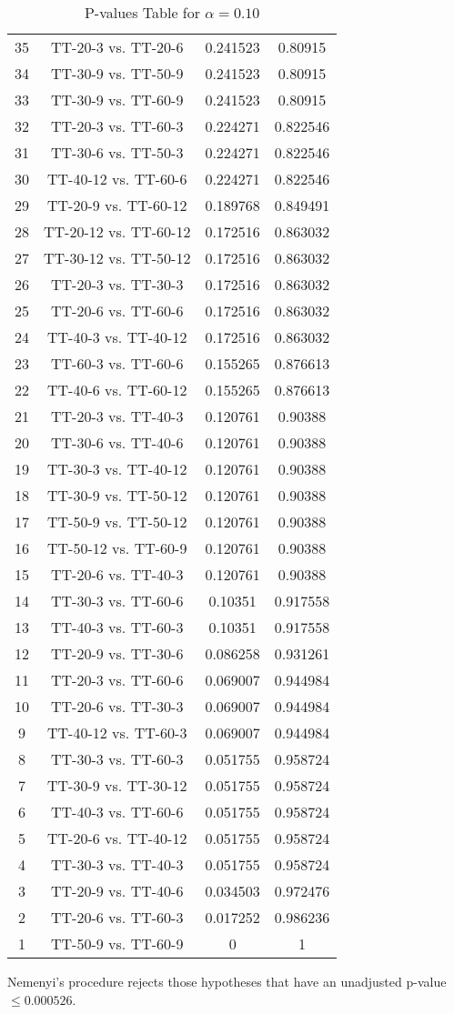\documentclass[a4paper,10pt]{article}
\begin{document}
\begin{landscape}
\begin{table}[!htp]
\begin{tabular}{cccc}
35&TT-20-3 vs. TT-20-6&0.241523&0.80915\\
34&TT-30-9 vs. TT-50-9&0.241523&0.80915\\
33&TT-30-9 vs. TT-60-9&0.241523&0.80915\\
32&TT-20-3 vs. TT-60-3&0.224271&0.822546\\
31&TT-30-6 vs. TT-50-3&0.224271&0.822546\\
30&TT-40-12 vs. TT-60-6&0.224271&0.822546\\
29&TT-20-9 vs. TT-60-12&0.189768&0.849491\\
28&TT-20-12 vs. TT-60-12&0.172516&0.863032\\
27&TT-30-12 vs. TT-50-12&0.172516&0.863032\\
26&TT-20-3 vs. TT-30-3&0.172516&0.863032\\
25&TT-20-6 vs. TT-60-6&0.172516&0.863032\\
24&TT-40-3 vs. TT-40-12&0.172516&0.863032\\
23&TT-60-3 vs. TT-60-6&0.155265&0.876613\\
22&TT-40-6 vs. TT-60-12&0.155265&0.876613\\
21&TT-20-3 vs. TT-40-3&0.120761&0.90388\\
20&TT-30-6 vs. TT-40-6&0.120761&0.90388\\
19&TT-30-3 vs. TT-40-12&0.120761&0.90388\\
18&TT-30-9 vs. TT-50-12&0.120761&0.90388\\
17&TT-50-9 vs. TT-50-12&0.120761&0.90388\\
16&TT-50-12 vs. TT-60-9&0.120761&0.90388\\
15&TT-20-6 vs. TT-40-3&0.120761&0.90388\\
14&TT-30-3 vs. TT-60-6&0.10351&0.917558\\
13&TT-40-3 vs. TT-60-3&0.10351&0.917558\\
12&TT-20-9 vs. TT-30-6&0.086258&0.931261\\
11&TT-20-3 vs. TT-60-6&0.069007&0.944984\\
10&TT-20-6 vs. TT-30-3&0.069007&0.944984\\
9&TT-40-12 vs. TT-60-3&0.069007&0.944984\\
8&TT-30-3 vs. TT-60-3&0.051755&0.958724\\
7&TT-30-9 vs. TT-30-12&0.051755&0.958724\\
6&TT-40-3 vs. TT-60-6&0.051755&0.958724\\
5&TT-20-6 vs. TT-40-12&0.051755&0.958724\\
4&TT-30-3 vs. TT-40-3&0.051755&0.958724\\
3&TT-20-9 vs. TT-40-6&0.034503&0.972476\\
2&TT-20-6 vs. TT-60-3&0.017252&0.986236\\
1&TT-50-9 vs. TT-60-9&0&1\\
\hline
\end{tabular}
\caption{P-values Table for $\alpha=0.10$}
\end{table}Nemenyi's procedure rejects those hypotheses that have an unadjusted p-value $\le0.000526$.


\end{landscape}
\end{document}
